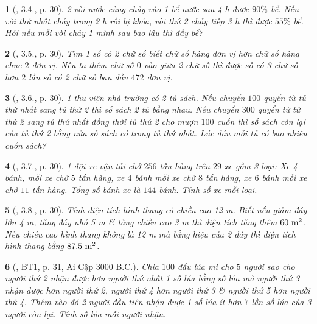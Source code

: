 \documentclass{article}
\newtheorem{baitoan}{}
\begin{document}
\begin{baitoan}[\cite{Binh_boi_duong_Toan_9_tap_2}, 3.4., p. 30]
	2 vòi nước cùng chảy vào 1 bể nước sau {\rm4 h} được $90\%$ bể. Nếu vòi thứ nhất chảy trong {\rm2 h} rồi bị khóa, vòi thứ 2 chảy tiếp {\rm3 h} thì được $55\%$ bể. Hỏi nếu mỗi vòi chảy 1 mình sau bao lâu thì đầy bể?
\end{baitoan}

\begin{baitoan}[\cite{Binh_boi_duong_Toan_9_tap_2}, 3.5., p. 30]
	Tìm 1 số có 2 chữ số biết chữ số hàng đơn vị hơn chữ số hàng chục $2$ đơn vị. Nếu ta thêm chữ số $0$ vào giữa 2 chữ số thì được số có 3 chữ số hơn $2$ lần số có 2 chữ số ban đầu $472$ đơn vị.
\end{baitoan}

\begin{baitoan}[\cite{Binh_boi_duong_Toan_9_tap_2}, 3.6., p. 30]
	1 thư viện nhà trường có 2 tủ sách. Nếu chuyển $100$ quyển từ tủ thứ nhất sang tủ thứ 2 thì số sách 2 tủ bằng nhau. Nếu chuyển $300$ quyển từ tử thứ 2 sang tủ thứ nhất đồng thời tủ thứ 2 cho mượn $100$ cuốn thì số sách còn lại của tủ thứ 2 bằng nửa số sách có trong tủ thứ nhất. Lúc đầu mỗi tủ có bao nhiêu cuốn sách?
\end{baitoan}

\begin{baitoan}[\cite{Binh_boi_duong_Toan_9_tap_2}, 3.7., p. 30]
	1 đội xe vận tải chở $256$ tấn hàng trên $29$ xe gồm 3 loại: Xe 4 bánh, mỗi xe chở $5$ tấn hàng, xe $4$ bánh mỗi xe chở $8$ tấn hàng, xe $6$ bánh mỗi xe chở $11$ tấn hàng. Tổng số bánh xe là $144$ bánh. Tính số xe mỗi loại.
\end{baitoan}

\begin{baitoan}[\cite{Binh_boi_duong_Toan_9_tap_2}, 3.8., p. 30]
	Tính diện tích hình thang có chiều cao {\rm12 m}. Biết nếu giảm đáy lớn {\rm4 m}, tăng đáy nhỏ {\rm5 m} \& tăng chiều cao {\rm3 m} thì diện tích tăng thêm $\rm60\ m^2$. Nếu chiều cao hình thang không là {\rm12 m} mà bằng hiệu của 2 đáy thì diện tích hình thang bằng $\rm87.5\ m^2$.
\end{baitoan}

\begin{baitoan}[\cite{Binh_boi_duong_Toan_9_tap_2}, BT1, p. 31, Ai Cập 3000 B.C.]
	Chia $100$ đấu lúa mì cho $5$ người sao cho người thứ 2 nhận được hơn người thứ nhất 1 số lúa bằng số lúa mà người thứ 3 nhận được hơn người thứ 2, người thứ 4 hơn người thứ 3 \& người thứ 5 hơn người thứ 4. Thêm vào đó 2 người đầu tiên nhận được 1 số lúa ít hơn $7$ lần số lúa của 3 người còn lại. Tính số lúa mỗi người nhận.
\end{baitoan}
\end{document}
